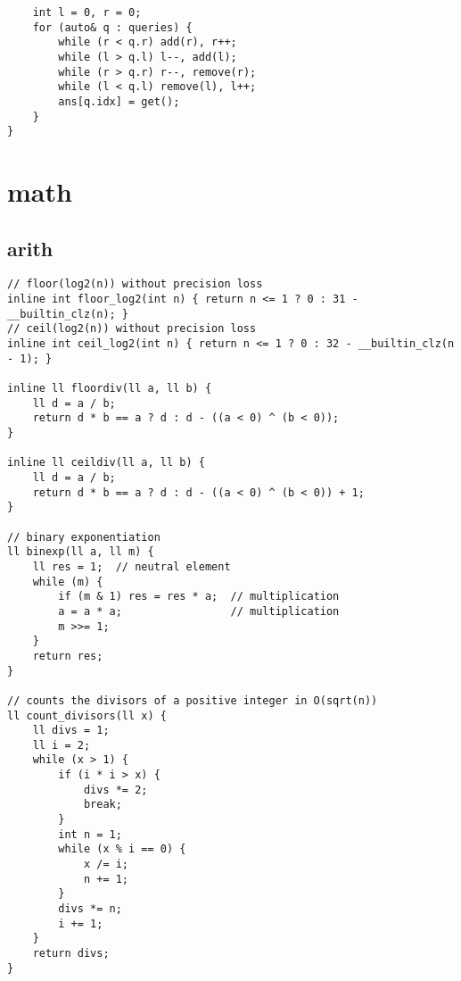 \documentclass[twoside]{article}
\begin{document}
\begin{multicols*}{2}
\begin{verbatim}
    int l = 0, r = 0;
    for (auto& q : queries) {
        while (r < q.r) add(r), r++;
        while (l > q.l) l--, add(l);
        while (r > q.r) r--, remove(r);
        while (l < q.l) remove(l), l++;
        ans[q.idx] = get();
    }
}
\end{verbatim}

{
[\vspace{2em}]
\section*{math}
}
{
\subsection*{arith}
}
\begin{verbatim}
// floor(log2(n)) without precision loss
inline int floor_log2(int n) { return n <= 1 ? 0 : 31 - __builtin_clz(n); }
// ceil(log2(n)) without precision loss
inline int ceil_log2(int n) { return n <= 1 ? 0 : 32 - __builtin_clz(n - 1); }

inline ll floordiv(ll a, ll b) {
    ll d = a / b;
    return d * b == a ? d : d - ((a < 0) ^ (b < 0));
}

inline ll ceildiv(ll a, ll b) {
    ll d = a / b;
    return d * b == a ? d : d - ((a < 0) ^ (b < 0)) + 1;
}

// binary exponentiation
ll binexp(ll a, ll m) {
    ll res = 1;  // neutral element
    while (m) {
        if (m & 1) res = res * a;  // multiplication
        a = a * a;                 // multiplication
        m >>= 1;
    }
    return res;
}

// counts the divisors of a positive integer in O(sqrt(n))
ll count_divisors(ll x) {
    ll divs = 1;
    ll i = 2;
    while (x > 1) {
        if (i * i > x) {
            divs *= 2;
            break;
        }
        int n = 1;
        while (x % i == 0) {
            x /= i;
            n += 1;
        }
        divs *= n;
        i += 1;
    }
    return divs;
}


\end{verbatim}
\end{multicols*}
\end{document}
